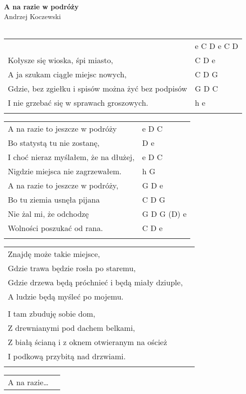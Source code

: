 \documentclass[a5paper]{article}
\begin{document}


\noindent
\fontsize{12pt}{15pt}\selectfont
\textbf{A na razie w podróży} \\
\fontsize{8pt}{10pt}\selectfont
Andrzej Koczewski \\ \\
\fontsize{10pt}{12pt}\selectfont
{}
\begin{tabular}{@{}p{8.5cm}p{3cm}@{}}
\noindent
	& e C D e C D \\ 
Kołysze się wioska, śpi miasto, & C D e \\
A ja szukam ciągle miejsc nowych, & C D G \\
Gdzie, bez zgiełku i spisów można żyć bez podpisów & G D C \\
I nie grzebać się w sprawach groszowych. & h e \\ \\
\end{tabular}

\noindent
\begin{tabular}{@{}p{7.5cm}p{3cm}@{}}
A na razie to jeszcze w podróży & e D C \\
Bo statystą tu nie zostanę, & D e \\
I choć nieraz myślałem, że na dłużej, & e D C \\
Nigdzie miejsca nie zagrzewałem. & h G \\
A na razie to jeszcze w podróży, & G D e \\
Bo tu ziemia usnęła pijana & C D G \\
Nie żal mi, że odchodzę & G D G (D) e \\
Wolności poszukać od rana. & C D e \\ \\
\end{tabular}

\noindent
\begin{tabular}{@{}p{8.5cm}p{3cm}@{}}
Znajdę może takie miejsce, \\
Gdzie trawa będzie rosła po staremu, \\
Gdzie drzewa będą próchnieć i będą miały dziuple, \\
A ludzie będą myśleć po mojemu. \\ \\
I tam zbuduję sobie dom, \\
Z drewnianymi pod dachem belkami, \\
Z białą ścianą i z oknem otwieranym na oścież \\
I podkową przybitą nad drzwiami. \\ \\
\end{tabular}

\noindent
\begin{tabular}{@{}p{8.5cm}p{3cm}@{}}
A na razie…
\end{tabular}
\end{document}
